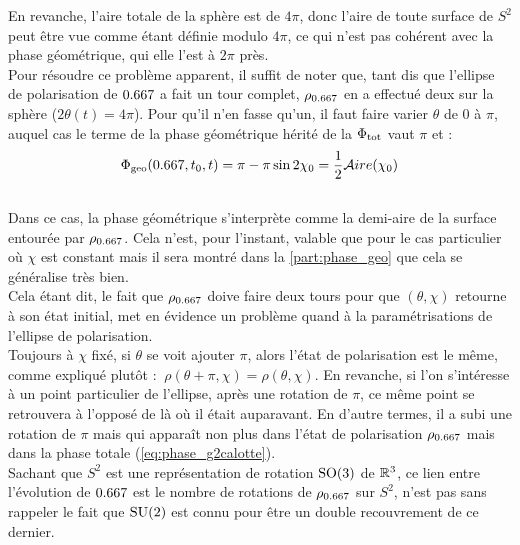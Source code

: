 En revanche, l'aire totale de la sphère est de $4\pi$, donc l'aire de toute surface de $S^2$ peut être vue comme étant définie modulo $4\pi$, ce qui n'est pas cohérent avec la phase géométrique, qui elle l'est à $2\pi$ près.
\\
Pour résoudre ce problème apparent, il suffit de noter que, tant dis que l’ellipse de polarisation de $\x$ a fait un tour complet, 
$\rho_{\x}$ en a effectué deux sur la sphère ($2\theta(t) = 4\pi$).
Pour qu'il n'en fasse qu'un, il faut faire varier $\theta$ de 0 à $\pi$, auquel cas le terme de la phase géométrique hérité de la $\Phi_{\text{\normalfont tot}}$ vaut $\pi$ et :
\begin{equation} \label{eq:phase_g2calotte}
	\phaseg(\x, t_0, t) = \pi - \pi\sin 2\chi_0 = \frac{1}{2}\mathcal{A}ire(\chi_0)
\end{equation}
\\
Dans ce cas, la phase géométrique s'interprète comme la demi-aire de la surface entourée par $\rho_{\x}$. Cela n'est, pour l'instant, valable que pour le cas particulier où $\chi$ est constant mais il sera montré dans la \cref{part:phase_geo} que cela se généralise très bien.
\\

Cela étant dit, le fait que $\rho_{\x}$ doive faire deux tours pour que $(\theta,\chi)$ retourne à son état initial, met en évidence un problème quand à la paramétrisations de l'ellipse de polarisation.
\\
Toujours à $\chi$ fixé, si $\theta$ se voit ajouter $\pi$, alors l'état de polarisation est le même, comme expliqué plutôt : $\ \rho(\theta+\pi,\chi) = \rho(\theta, \chi)$.
En revanche, si l'on s'intéresse à un point particulier de l'ellipse, après une rotation de $\pi$, ce même point se retrouvera à l'opposé de là où il était auparavant. 
En d'autre termes, il a subi une rotation de $\pi$ mais qui apparaît non plus dans l'état de polarisation $\rho_{\x}$ mais dans la phase totale (\cref{eq:phase_g2calotte}).
\\
Sachant que $S^2$ est une représentation de rotation $\text{\normalfont SO}(3)$ de $\mathbb{R}^3$, ce lien entre l'évolution de $\x$ est le nombre de rotations de $\rho_{\x}$ sur $S^2$, n'est pas sans rappeler le fait que $\text{\normalfont SU}(2)$ est connu pour être un double recouvrement de ce dernier.
\\
\\




